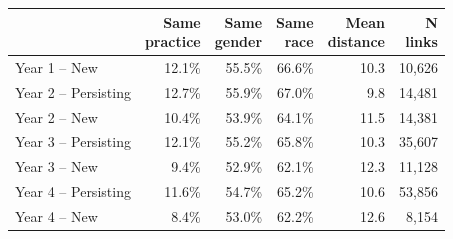 
\begin{tabular}{lrrrrr}
\toprule
  & \shortstack[r]{Same \\ practice} & \shortstack[r]{Same \\ gender} & \shortstack[r]{Same \\ race} & \shortstack[r]{Mean \\ distance} & \shortstack[r]{N \\ links}\\
\midrule
Year 1 -- New & 12.1\% & 55.5\% & 66.6\% & 10.3 & 10,626\\
Year 2 -- Persisting & 12.7\% & 55.9\% & 67.0\% & 9.8 & 14,481\\
Year 2 -- New & 10.4\% & 53.9\% & 64.1\% & 11.5 & 14,381\\
Year 3 -- Persisting & 12.1\% & 55.2\% & 65.8\% & 10.3 & 35,607\\
Year 3 -- New & 9.4\% & 52.9\% & 62.1\% & 12.3 & 11,128\\
Year 4 -- Persisting & 11.6\% & 54.7\% & 65.2\% & 10.6 & 53,856\\
Year 4 -- New & 8.4\% & 53.0\% & 62.2\% & 12.6 & 8,154\\
\bottomrule
\end{tabular}
